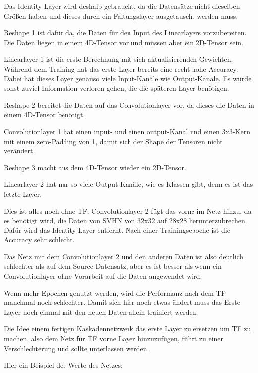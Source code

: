     Das Identity-Layer wird deshalb gebraucht, da die Datensätze nicht 
    dieselben Größen haben und dieses durch ein Faltungslayer ausgetauscht 
    werden muss.

    Reshape 1 ist dafür da, die Daten für den Input des Linearlayers vorzubereiten. 
    Die Daten liegen in einem 4D-Tensor vor und müssen aber ein 2D-Tensor sein. 

    Linearlayer 1 ist die erste Berechnung mit sich aktualisierenden Gewichten. 
    Während dem Training hat das erste Layer bereits eine recht hohe Accuracy. 
    Dabei hat dieses Layer genauso viele Input-Kanäle wie Output-Kanäle. 
    Es würde sonst zuviel Information verloren gehen, die die späteren Layer benötigen.

    Reshape 2 bereitet die Daten auf das Convolutionlayer vor, da dieses die Daten 
    in einem 4D-Tensor benötigt.

    Convolutionlayer 1 hat einen input- und einen output-Kanal und einen 3x3-Kern 
    mit einem zero-Padding von 1, damit sich der Shape der Tensoren nicht verändert. 

    Reshape 3 macht aus dem 4D-Tensor wieder ein 2D-Tensor.

    Linearlayer 2 hat nur so viele Output-Kanäle, wie es Klassen gibt, denn es 
    ist das letzte Layer. 

    Dies ist alles noch ohne TF.
    Convolutionlayer 2 fügt das vorne im Netz hinzu, da es benötigt wird, die 
    Daten von SVHN von 32x32 auf 28x28 herunterzubrechen. Dafür wird das Identity-Layer 
    entfernt. Nach einer Trainingsepoche ist die Accuracy sehr schlecht.

    Das Netz mit dem Convolutionlayer 2 und den anderen Daten ist also deutlich schlechter 
    als auf dem Source-Datensatz, aber es ist besser als wenn ein Convolutionlayer ohne Vorarbeit 
    auf die Daten angewendet wird.

    Wenn mehr Epochen genutzt werden, wird die Performanz nach dem TF manchmal 
    noch schlechter. Damit sich hier noch etwas ändert muss das Erste Layer noch 
    einmal mit den neuen Daten allein trainiert werden.

    Die Idee einem fertigen Kaskadennetzwerk das erste Layer zu ersetzen um TF zu machen, also 
    dem Netz für TF vorne Layer hinzuzufügen, führt zu einer Verschlechterung und sollte 
    unterlassen werden.

    Hier ein Beispiel der Werte des Netzes:

